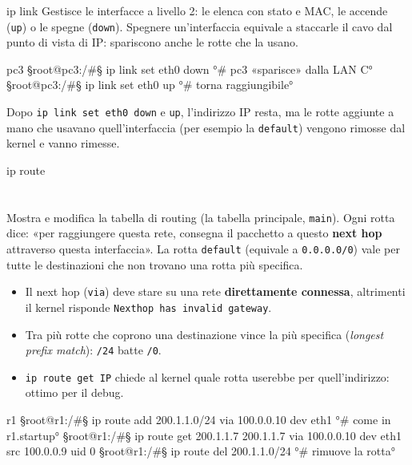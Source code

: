 \begin{scheda}{ip link}
 \quad {} \quad {}
Gestisce le interfacce a livello 2: le elenca con stato e MAC, le accende (\texttt{up}) o le spegne (\texttt{down}). Spegnere un'interfaccia equivale a staccarle il cavo dal punto di vista di IP: spariscono anche le rotte che la usano.
\begin{terminale}{pc3}
§root@pc3:/#§ ip link set eth0 down     °# pc3 «sparisce» dalla LAN C°
§root@pc3:/#§ ip link set eth0 up       °# torna raggiungibile°
\end{terminale}
\end{scheda}
\begin{attenzione}
Dopo \texttt{ip link set eth0 down} e \texttt{up}, l'indirizzo IP resta, ma le rotte aggiunte a mano che usavano quell'interfaccia (per esempio la \texttt{default}) vengono rimosse dal kernel e vanno rimesse.
\end{attenzione}

\begin{scheda}{ip route}
\\[3pt]
\\[3pt]
\\[3pt]
 \quad {}
Mostra e modifica la tabella di routing (la tabella principale, \texttt{main}). Ogni rotta dice: «per raggiungere questa rete, consegna il pacchetto a questo \textbf{next hop} attraverso questa interfaccia». La rotta \texttt{default} (equivale a \texttt{0.0.0.0/0}) vale per tutte le destinazioni che non trovano una rotta più specifica.
\begin{itemize}
  \item Il next hop (\texttt{via}) deve stare su una rete \textbf{direttamente connessa}, altrimenti il kernel risponde \texttt{Nexthop has invalid gateway}.
  \item Tra più rotte che coprono una destinazione vince la più specifica (\emph{longest prefix match}): \texttt{/24} batte \texttt{/0}.
  \item \texttt{ip route get IP} chiede al kernel quale rotta userebbe per quell'indirizzo: ottimo per il debug.
\end{itemize}
\begin{terminale}{r1}
§root@r1:/#§ ip route add 200.1.1.0/24 via 100.0.0.10 dev eth1   °# come in r1.startup°
§root@r1:/#§ ip route get 200.1.1.7
200.1.1.7 via 100.0.0.10 dev eth1 src 100.0.0.9 uid 0
§root@r1:/#§ ip route del 200.1.1.0/24                           °# rimuove la rotta°
\end{terminale}
\end{scheda}

